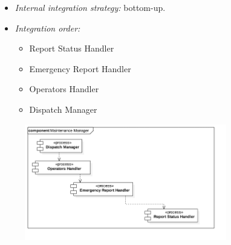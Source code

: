 			\begin{itemize}[label={},leftmargin=*,noitemsep,topsep=0pt]
				\item \textit{Internal integration strategy:} bottom-up.
				\item \textit{Integration order:}
					\begin{itemize}[noitemsep]
						\item Report Status Handler
						\item Emergency Report Handler
						\item Operators Handler
						\item Dispatch Manager
					\end{itemize}
			\end{itemize}
			\begin{figure}[h]
				\includegraphics[width=250pt, center]{img/integration_strategy/subcomponents/maintenance_manager.png}
			\end{figure}
		\FloatBarrier

